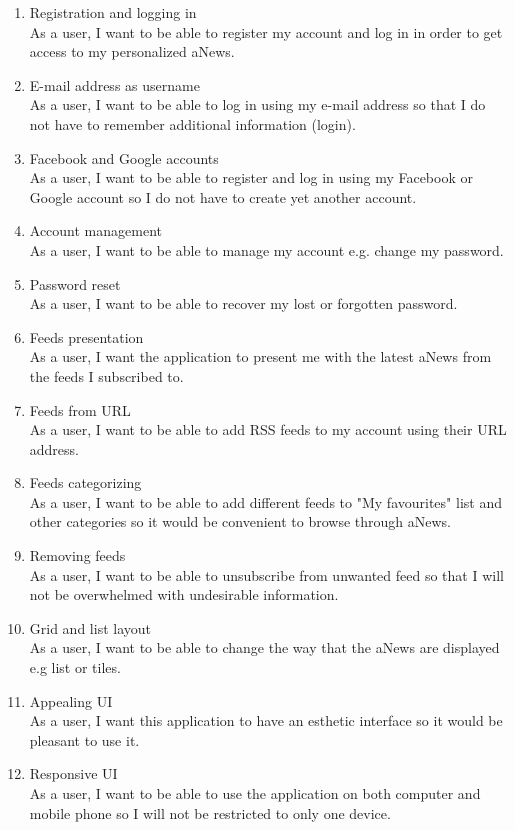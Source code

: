 \documentclass[]{article}
\begin{document}
\begin{enumerate}
	\item Registration and logging in\\
	As a user, I want to be able to register my account and log in in order to get access to my personalized aNews.
	
	\item E-mail address as username\\
	As a user, I want to be able to log in using my e-mail address so that I do not have to remember additional information (login).
	
	\item Facebook and Google accounts\\
	As a user, I want to be able to register and log in using my Facebook or Google account so I do not have to create yet another account.
	
	\item Account management\\
	As a user, I want to be able to manage my account e.g. change my password.
	
	\item Password reset\\
	As a user, I want to be able to recover my lost or forgotten password.
	
	\item Feeds presentation\\
	As a user, I want the application to present me with the latest aNews from the feeds I subscribed to.
	
	\item Feeds from URL\\
	As a user, I want to be able to add RSS feeds to my account using their URL address.
	
	\item Feeds categorizing\\
	As a user, I want to be able to add different feeds to "My favourites" list and other categories so it would be convenient to browse through aNews.
	
	\item Removing feeds\\
	As a user, I want to be able to unsubscribe from unwanted feed so that I will not be overwhelmed with undesirable information. 
	
	\item Grid and list layout\\
	As a user, I want to be able to change the way that the aNews are displayed e.g list or tiles.
	
	\item Appealing UI\\
	As a user, I want this application to have an esthetic interface so it would be pleasant to use it.
	
	\item Responsive UI\\
	As a user, I want to be able to use the application on both computer and mobile phone so I will not be restricted to only one device.
\end{enumerate}
\end{document}
